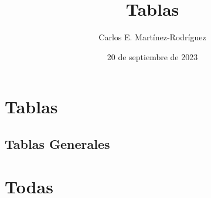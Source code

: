 \documentclass[12pt]{article}
\title{Tablas}
\author{Carlos E. Martínez-Rodríguez}
\date{20 de septiembre de 2023}
\begin{document}
\maketitle

\section{Tablas}

\subsection{Tablas Generales}















\section{Todas}
\end{document}
